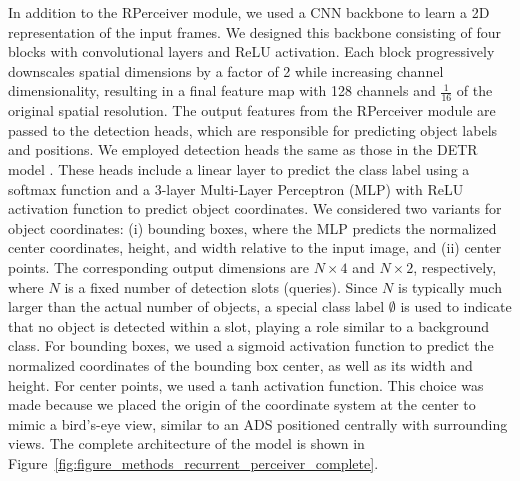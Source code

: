 In addition to the RPerceiver module, we used a CNN backbone to learn a 2D representation of the input frames. We designed this backbone consisting of four blocks with convolutional layers and ReLU activation. Each block progressively downscales spatial dimensions by a factor of 2 while increasing channel dimensionality, resulting in a final feature map with 128 channels and $\frac{1}{16}$ of the original spatial resolution.
The output features from the RPerceiver module are passed to the detection heads, which are responsible for predicting object labels and positions. We employed detection heads the same as those in the DETR model \cite{carionEndtoEndObjectDetection2020}. These heads include a linear layer to predict the class label using a softmax function and a 3-layer Multi-Layer Perceptron (MLP) with ReLU activation function to predict object coordinates. We considered two variants for object coordinates: (i) bounding boxes, where the MLP predicts the normalized center coordinates, height, and width relative to the input image, and (ii) center points. The corresponding output dimensions are $N \times 4$ and $N \times 2$, respectively, where $N$ is a fixed number of detection slots (queries). Since $N$ is typically much larger than the actual number of objects, a special class label $\emptyset$ is used to indicate that no object is detected within a slot, playing a role similar to a background class.
For bounding boxes, we used a sigmoid activation function to predict the normalized coordinates of the bounding box center, as well as its width and height. For center points, we used a tanh activation function. This choice was made because we placed the origin of the coordinate system at the center to mimic a bird's-eye view, similar to an ADS positioned centrally with surrounding views.
The complete architecture of the model is shown in Figure~\ref{fig:figure_methods_recurrent_perceiver_complete}.


